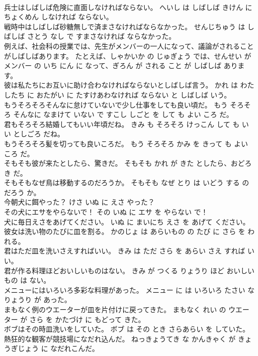 \documentclass[8pt]{extreport}
\begin{document}
\begin{CJK}{UTF8}{min}
\\	兵士はしばしば危険に直面しなければならない。	へいし は しばしば きけん に ちょくめん しなければ ならない。	
\\	戦時中はしばしば砂糖無しで済まさなければならなかった。	せんじちゅう は しばしば さとう なし で すまさなければ ならなかった。	
\\	例えば、社会科の授業では、先生がメンバーの一人になって、議論がされることがしばしばあります。	たとえば、しゃかいか の じゅぎょう では、せんせい が メンバー の いち にん に なって、ぎろん が される こと が しばしば あります。	
\\	彼は私たちにお互いに助け合わなければならないとしばしば言う。	かれ は わたしたち に おたがい に たすけあわなければ ならない と しばしば いう。	
\\	もうそろそろそんなに怠けていないで少し仕事をしても良い頃だ。	もう そろそろ そんなに なまけて いない で すこし しごと を して も よい ころ だ。	
\\	君もそろそろ結婚してもいい年頃だね。	きみ も そろそろ けっこん して も いい としごろ だね。	
\\	もうそろそろ髪を切っても良いころだ。	もう そろそろ かみ を きって も よい ころ だ。	
\\	そもそも彼が来たとしたら、驚きだ。	そもそも かれ が きた としたら、おどろき だ。	
\\	そもそもなぜ鳥は移動するのだろうか。	そもそも なぜ とり は いどう する の だろう か。	
\\	今朝犬に餌やった？	けさ いぬ に えさ やった？	
\\	その犬にエサをやらないで！	その いぬ に エサ を やらない で！	
\\	犬に毎日えさをあげてください。	いぬ に まいにち えさ を あげて ください。	
\\	彼女は洗い物のたびに皿を割る。	かのじょ は あらいもの の たび に さら を われる。	
\\	君はただ皿を洗いさえすればいい。	きみ は ただ さら を あらい さえ すれば いい。	
\\	君が作る料理ほどおいしいものはない。	きみ が つくる りょうり ほど おいしい もの は ない。	
\\	メニューにはいろいろ多彩な料理があった。	メニュー に は いろいろ たさい な りょうり が あった。	
\\	まもなく例のウエーターが皿を片付けに戻ってきた。	まもなく れい の ウエーター が さら を かたづけ に もどって きた。	
\\	ボブはその時皿洗いをしていた。	ボブ は その とき さらあらい を していた。	
\\	熱狂的な観客が競技場になだれ込んだ。	ねっきょうてき な かんきゃく が きょうぎじょう に なだれこんだ。	

\end{CJK}
\end{document}
